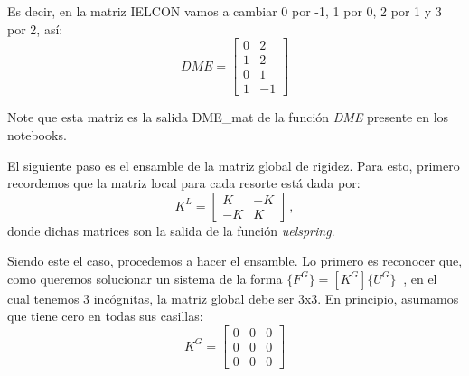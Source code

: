 Es decir, en la matriz IELCON vamos a cambiar 0 por -1, 1 por 0, 2 por 1 y 3 
por 2, así:
$$DME = 
\begin{bmatrix}
0 & 2 \\
1 & 2 \\
0 & 1 \\
1 & -1 
\end{bmatrix}
$$

Note que esta matriz es la salida DME\_mat de la función \textit{DME} presente 
en los notebooks.

El siguiente paso es el ensamble de la matriz global de rigidez. Para esto, 
primero recordemos que la matriz local para cada resorte está dada por:
$$K^L = 
\begin{bmatrix}
K & -K \\
-K & K 
\end{bmatrix}\, ,
$$
donde dichas matrices son la salida de la función \textit{uelspring}.


Siendo este el caso, procedemos a hacer el ensamble. Lo primero es reconocer 
que, como queremos solucionar un sistema de la forma $ \{ F^G \} = [ K^G ] \{ 
U^G \}\ $ , en el cual tenemos 3 incógnitas, la matriz global debe ser 3x3. En 
principio, asumamos que tiene cero en todas sus casillas:
$$K^G = 
\begin{bmatrix}
0 & 0 & 0 \\
0 & 0 & 0 \\
0 & 0 & 0 
\end{bmatrix}
$$

